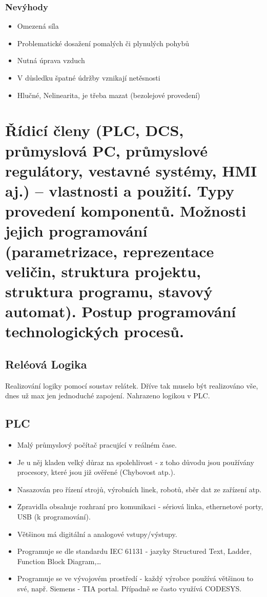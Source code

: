 \subsubsection*{Nevýhody}
\begin{itemize}
    \item Omezená síla
    \item Problematické dosažení pomalých či plynulých pohybů
    \item Nutná úprava vzduch
    \item V důsledku špatné údržby vznikají netěsnosti
    \item Hlučné, Nelinearita, je třeba mazat (bezolejové provedení)
\end{itemize}

\section{Řídicí členy (PLC, DCS, průmyslová PC, průmyslové regulátory, vestavné systémy, HMI aj.) – vlastnosti a použití. Typy provedení komponentů. Možnosti jejich programování (parametrizace, reprezentace veličin, struktura projektu, struktura programu, stavový automat). Postup programování technologických procesů.}

\subsection{Reléová Logika}
Realizování logiky pomocí soustav relátek. Dříve tak muselo být realizováno vše, dnes už max jen jednoduché zapojení. Nahrazeno logikou v PLC.

\subsection{PLC}
\begin{itemize}
    \item Malý průmyslový počítač pracující v reálném čase.
    \item Je u něj kladen velký důraz na spolehlivost - z toho důvodu jsou používány procesory, které jsou již ověřené (Chybovost atp.).
    \item Nasazován pro řízení strojů, výrobních linek, robotů, sběr dat ze zařízení atp.
    \item Zpravidla obsahuje rozhraní pro komunikaci - sériová linka, ethernetové porty, USB (k programování).
    \item Většinou má digitální a analogové vstupy/výstupy.
    \item Programuje se dle standardu IEC 61131 - jazyky Structured Text, Ladder, Function Block Diagram,\dots
    \item Programuje se ve vývojovém prostředí - každý výrobce používá většinou to své, např. Siemens - TIA portal. Případně se často využívá CODESYS.
\end{itemize}

